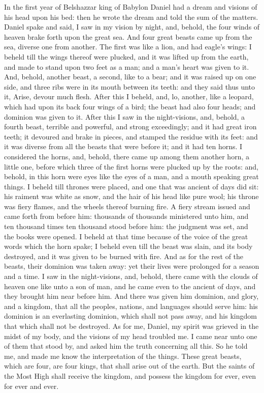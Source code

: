 In the first year of Belshazzar king of Babylon Daniel had a dream and visions of his head upon his bed: then he wrote the dream and told the sum of the matters. Daniel spake and said, I saw in my vision by night, and, behold, the four winds of heaven brake forth upon the great sea. And four great beasts came up from the sea, diverse one from another. The first was like a lion, and had eagle’s wings: I beheld till the wings thereof were plucked, and it was lifted up from the earth, and made to stand upon two feet as a man; and a man’s heart was given to it. And, behold, another beast, a second, like to a bear; and it was raised up on one side, and three ribs were in its mouth between its teeth: and they said thus unto it, Arise, devour much flesh. After this I beheld, and, lo, another, like a leopard, which had upon its back four wings of a bird; the beast had also four heads; and dominion was given to it. After this I saw in the night-visions, and, behold, a fourth beast, terrible and powerful, and strong exceedingly; and it had great iron teeth; it devoured and brake in pieces, and stamped the residue with its feet: and it was diverse from all the beasts that were before it; and it had ten horns. I considered the horns, and, behold, there came up among them another horn, a little one, before which three of the first horns were plucked up by the roots: and, behold, in this horn were eyes like the eyes of a man, and a mouth speaking great things.  I beheld till thrones were placed, and one that was ancient of days did sit: his raiment was white as snow, and the hair of his head like pure wool; his throne was fiery flames, and the wheels thereof burning fire. A fiery stream issued and came forth from before him: thousands of thousands ministered unto him, and ten thousand times ten thousand stood before him: the judgment was set, and the books were opened. I beheld at that time because of the voice of the great words which the horn spake; I beheld even till the beast was slain, and its body destroyed, and it was given to be burned with fire. And as for the rest of the beasts, their dominion was taken away: yet their lives were prolonged for a season and a time.  I saw in the night-visions, and, behold, there came with the clouds of heaven one like unto a son of man, and he came even to the ancient of days, and they brought him near before him. And there was given him dominion, and glory, and a kingdom, that all the peoples, nations, and languages should serve him: his dominion is an everlasting dominion, which shall not pass away, and his kingdom that which shall not be destroyed.  As for me, Daniel, my spirit was grieved in the midst of my body, and the visions of my head troubled me. I came near unto one of them that stood by, and asked him the truth concerning all this. So he told me, and made me know the interpretation of the things. These great beasts, which are four, are four kings, that shall arise out of the earth. But the saints of the Most High shall receive the kingdom, and possess the kingdom for ever, even for ever and ever. 